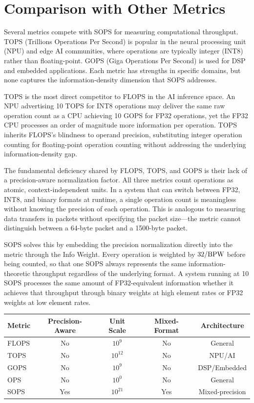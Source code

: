 \section{Comparison with Other Metrics}
\label{sec:comparison_metrics}

Several metrics compete with SOPS for measuring computational throughput. TOPS (Trillions Operations Per Second) is popular in the neural processing unit (NPU) and edge AI communities, where operations are typically integer (INT8) rather than floating-point. GOPS (Giga Operations Per Second) is used for DSP and embedded applications. Each metric has strengths in specific domains, but none captures the information-density dimension that SOPS addresses.

TOPS is the most direct competitor to FLOPS in the AI inference space. An NPU advertising 10 TOPS for INT8 operations may deliver the same raw operation count as a CPU achieving 10 GOPS for FP32 operations, yet the FP32 CPU processes an order of magnitude more information per operation. TOPS inherits FLOPS's blindness to operand precision, substituting integer operation counting for floating-point operation counting without addressing the underlying information-density gap.

The fundamental deficiency shared by FLOPS, TOPS, and GOPS is their lack of a precision-aware normalization factor. All three metrics count operations as atomic, context-independent units. In a system that can switch between FP32, INT8, and binary formats at runtime, a single operation count is meaningless without knowing the precision of each operation. This is analogous to measuring data transfers in packets without specifying the packet size---the metric cannot distinguish between a 64-byte packet and a 1500-byte packet.

SOPS solves this by embedding the precision normalization directly into the metric through the Info Weight. Every operation is weighted by $32 / \textnormal{BPW}$ before being counted, so that one SOPS always represents the same information-theoretic throughput regardless of the underlying format. A system running at 10 SOPS processes the same amount of FP32-equivalent information whether it achieves that throughput through binary weights at high element rates or FP32 weights at low element rates.

\begin{center}
\tablestyle
\begin{tabular}{lcccc}
\toprule
\textbf{Metric} & \textbf{Precision-Aware} & \textbf{Unit Scale} & \textbf{Mixed-Format} & \textbf{Architecture} \\
\midrule
FLOPS & No & $10^9$ & No & General \\
TOPS & No & $10^{12}$ & No & NPU/AI \\
GOPS & No & $10^9$ & No & DSP/Embedded \\
OPS & No & $10^0$ & No & General \\
SOPS & Yes & $10^{21}$ & Yes & Mixed-precision \\
\bottomrule
\end{tabular}
\end{center}


